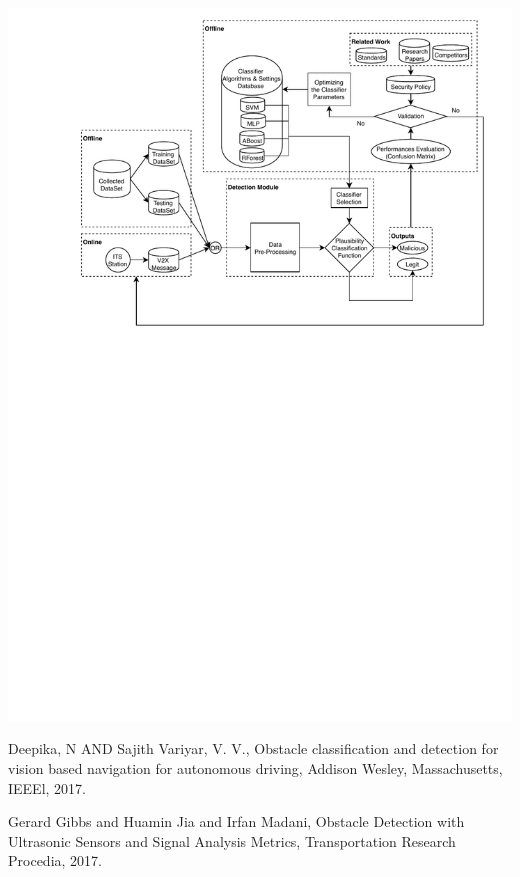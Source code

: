 \documentclass[a4paper]{report}
\begin{document}
\begin{center}
   \includegraphics[width=\textwidth]{MLFramework.pdf}
\end{center}


\begin{thebibliography}{9}
          Deepika, N AND Sajith Variyar, V. V.,
          Obstacle classification and detection for vision based navigation for autonomous driving,
          Addison Wesley, Massachusetts,
          IEEEl,
          2017.
     
         
          Gerard Gibbs and Huamin Jia and Irfan Madani,
          Obstacle Detection with Ultrasonic Sensors and Signal Analysis Metrics,
          Transportation Research Procedia,
          2017.
          
\end{thebibliography}
\end{document}
